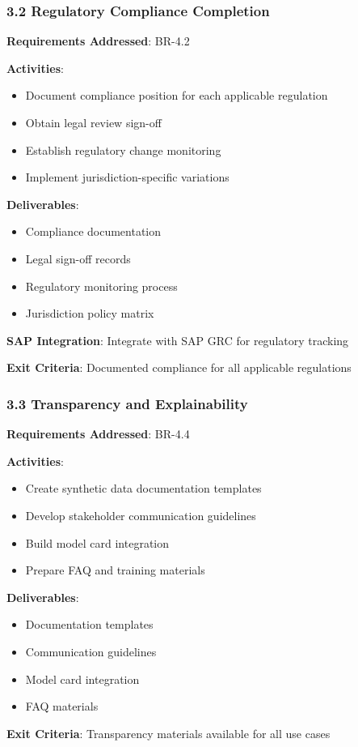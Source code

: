 \documentclass[12pt,a4paper,twoside]{report}
\begin{document}
\subsubsection{3.2 Regulatory Compliance Completion}

\begin{tcolorbox}[colback=orange!5,colframe=orange!70,title=3.2 Compliance Framework]
\textbf{Requirements Addressed}: BR-4.2

\textbf{Activities}:
\begin{itemize}
\item Document compliance position for each applicable regulation
\item Obtain legal review sign-off
\item Establish regulatory change monitoring
\item Implement jurisdiction-specific variations
\end{itemize}

\textbf{Deliverables}:
\begin{itemize}
\item Compliance documentation
\item Legal sign-off records
\item Regulatory monitoring process
\item Jurisdiction policy matrix
\end{itemize}

\textbf{SAP Integration}: Integrate with SAP GRC for regulatory tracking

\textbf{Exit Criteria}: Documented compliance for all applicable regulations
\end{tcolorbox}

\subsubsection{3.3 Transparency and Explainability}

\begin{tcolorbox}[colback=orange!5,colframe=orange!70,title=3.3 External Transparency]
\textbf{Requirements Addressed}: BR-4.4

\textbf{Activities}:
\begin{itemize}
\item Create synthetic data documentation templates
\item Develop stakeholder communication guidelines
\item Build model card integration
\item Prepare FAQ and training materials
\end{itemize}

\textbf{Deliverables}:
\begin{itemize}
\item Documentation templates
\item Communication guidelines
\item Model card integration
\item FAQ materials
\end{itemize}

\textbf{Exit Criteria}: Transparency materials available for all use cases
\end{tcolorbox}
\end{document}
